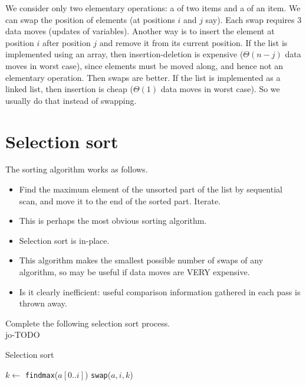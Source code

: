 We consider only two elementary operations: 
	a  of two items and a  of an item.
We can swap the position of elements (at positions $i$ and $j$ say). 
Each swap requires 3 data moves (updates of variables).
Another way is to insert the element at position $i$ after position $j$ and remove it from its current position.
If the list is implemented using an array, then insertion-deletion is expensive ($\Theta(n-j)$ data moves in worst case), 
since elements must be moved along, and hence not an elementary operation. Then swaps are better.
If the list is implemented as a linked list, then insertion is cheap ($\Theta(1)$ data moves in worst case).
So we usually do that instead of swapping.
	
\section{Selection sort} %
\label{sec:selectionsort}
The sorting algorithm  works as follows.
\begin{itemize} 
	\item Find the maximum element of the unsorted part of the list by sequential 
	scan, and move it to the end of the sorted part. Iterate.
	\item This is perhaps the most obvious sorting algorithm.
	\item Selection sort is in-place.
	\item This algorithm makes the smallest possible number of swaps of any algorithm, 
	so may be useful if data moves are VERY expensive.
	\item Is it clearly inefficient: useful comparison information gathered in each 
	pass is thrown away.
\end{itemize}

\begin{Boxample}[0]
Complete the following selection sort process.\\
jo-TODO
\end{Boxample}

\begin{algorithm}[H]
  \caption{Selection sort
    \label{alg:selsort}}
\begin{algorithmic}[1]
	\State $k \gets $ \texttt{findmax}($a[0..i]$)
		\State \texttt{swap}($a,i,k$)
	\EndIf
\EndFor
\State {}
\EndFunction
\end{algorithmic}
\end{algorithm}

